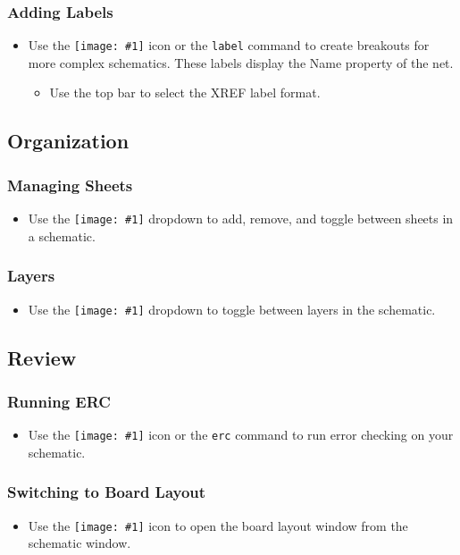 \documentclass{article}
\newcommand{\icon}[1]{\texttt{[image: \#1]}}
\begin{document}
\subsubsection{Adding Labels}
\begin{itemize}
    \item Use the \icon{label.png} icon or the \texttt{label} command to create breakouts for more complex schematics. These labels display the Name property of the net.
    \begin{itemize}
        \item Use the top bar to select the XREF label format.
    \end{itemize}
\end{itemize}

\subsection{Organization}
\subsubsection{Managing Sheets}
\begin{itemize}
    \item Use the \icon{sheet.png} dropdown to add, remove, and toggle between sheets in a schematic. 
\end{itemize}
\subsubsection{Layers}
\begin{itemize}
    \item Use the \icon{schlayer.png} dropdown to toggle between layers in the schematic.
\end{itemize}

\subsection{Review}
\subsubsection{Running ERC}
\begin{itemize}
    \item Use the \icon{erc.png} icon or the \texttt{erc} command to run error checking on your schematic.
\end{itemize}
\subsubsection{Switching to Board Layout}
\begin{itemize}
    \item Use the \icon{schbrd.png} icon to open the board layout window from the schematic window.
\end{itemize}
\end{document}
